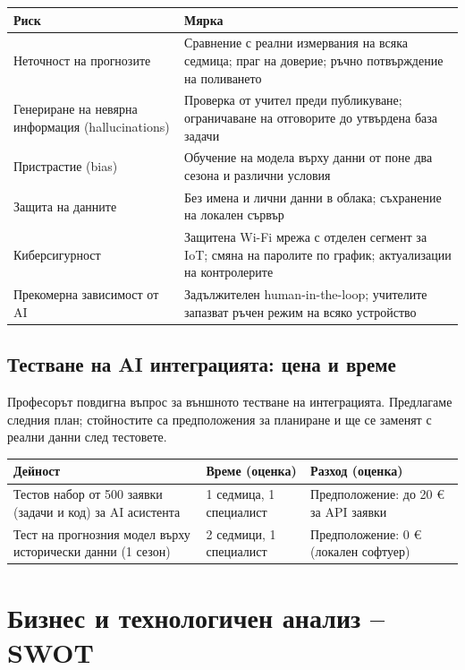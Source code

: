 \documentclass[11pt,a4paper]{article}
\begin{document}
\begin{tabularx}{\textwidth}{@{}>{\raggedright\arraybackslash}p{4.2cm}X@{}}
\toprule
Риск & Мярка \\
\midrule
Неточност на прогнозите & Сравнение с реални измервания на всяка седмица; праг на доверие; ръчно потвърждение на поливането \\
Генериране на невярна информация (hallucinations) & Проверка от учител преди публикуване; ограничаване на отговорите до утвърдена база задачи \\
Пристрастие (bias) & Обучение на модела върху данни от поне два сезона и различни условия \\
Защита на данните & Без имена и лични данни в облака; съхранение на локален сървър \\
Киберсигурност & Защитена Wi-Fi мрежа с отделен сегмент за IoT; смяна на паролите по график; актуализации на контролерите \\
Прекомерна зависимост от AI & Задължителен human-in-the-loop; учителите запазват ръчен режим на всяко устройство \\
\bottomrule
\end{tabularx}

\subsection{Тестване на AI интеграцията: цена и време}

Професорът повдигна въпрос за външното тестване на интеграцията. Предлагаме следния план; стойностите са предположения за планиране и ще се заменят с реални данни след тестовете.

\begin{tabularx}{\textwidth}{@{}>{\raggedright\arraybackslash}p{5.2cm}XX@{}}
\toprule
Дейност & Време (оценка) & Разход (оценка) \\
\midrule
Тестов набор от 500 заявки (задачи и код) за AI асистента & 1 седмица, 1 специалист & Предположение: до 20 € за API заявки \\
Тест на прогнозния модел върху исторически данни (1 сезон) & 2 седмици, 1 специалист & Предположение: 0 € (локален софтуер) \\
\bottomrule
\end{tabularx}

\section{Бизнес и технологичен анализ -- SWOT}
\end{document}

